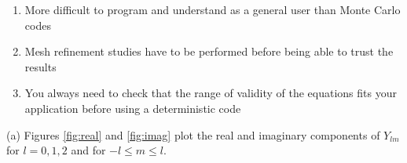 \documentclass[10pt]{article}
\newcommand*\circled[1]{\tikz[baseline=(char.base)]{
            \node[shape=circle,draw,inner sep=2pt] (char) {#1};}}
\begin{document}
\begin{enumerate}
\item More difficult to program and understand as a general user than Monte Carlo codes
\item Mesh refinement studies have to be performed before being able to trust the results
\item You always need to check that the range of validity of the equations fits your application before using a deterministic code
\end{enumerate}

\clearpage
\circled{4} (a) Figures \ref{fig:real} and \ref{fig:imag} plot the real and imaginary components of \(Y_{lm}\) for \(l=0, 1, 2\) and for \(-l\leq m\leq l\).

\end{document}

